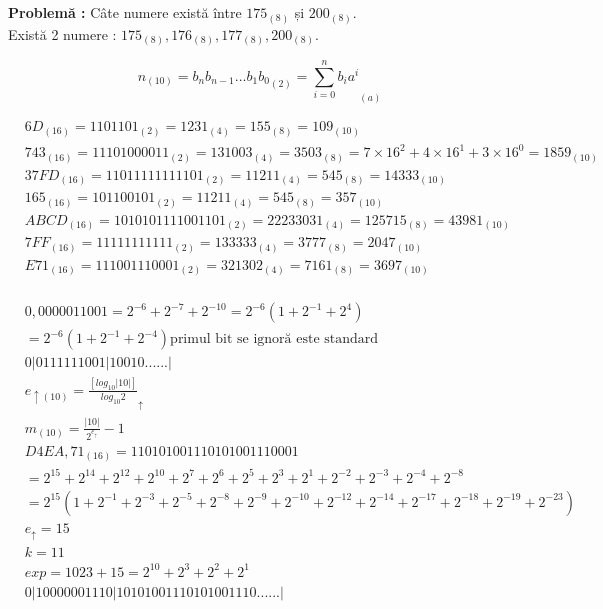 \documentclass[12pt]{article}
\begin{document}
\textbf{Problemă :}
Câte numere există între $175_{(8)}$ și $200_{(8)}$.\\
Există 2 numere : $175_{(8)}, 176_{(8)}, 177_{(8)}, 200_{(8)}$.

\begin{equation}
    n_{(10)}={b_{n}b_{n-1}...b_{1}b_{0}}_{(2)}={\sum_{i=0}^{n}b_{i}a^{i}}_{(a)}
\end{equation}

\begin{align*}
    & 6D_{(16)}=1101101_{(2)}=1231_{(4)}=155_{(8)}=109_{(10)}\\
    & 743_{(16)}=11101000011_{(2)}=131003_{(4)}=3503_{(8)}=7\times 16^2 + 4 \times 16^1 +3 \times 16^0 = 1859_{(10)}\\
    & 37FD_{(16)}=11011111111101_{(2)}=11211_{(4)}=545_{(8)}=14333_{(10)}\\
    & 165_{(16)}=101100101_{(2)}=11211_{(4)}=545_{(8)}=357_{(10)}\\
    & ABCD_{(16)}=1010101111001101_{(2)}=22233031_{(4)}=125715_{(8)}=43981_{(10)}\\
    & 7FF_{(16)}=11111111111_{(2)}=133333_{(4)}=3777_{(8)}=2047_{(10)}\\
    & E71_{(16)}=111001110001_{(2)}=321302_{(4)}=7161_{(8)}=3697_{(10)}\\
\end{align*}

\begin{align*}
    & 0,0000011001=2^{-6}+2^{-7}+2^{-10}=2^{-6}(1+2^{-1}+2^{4})\\
    & =2^{-6}(1+2^{-1}+2^{-4}) \text{primul bit se ignoră este standard}\\
    & 0|0111111001|10010......| \\
    & e_{\uparrow(10)}=\frac{[log_{10}|10|]}{log_{10}2}_{\uparrow} \\
    & m_{(10)}=\frac{|10|}{2^{e_{\uparrow}}}-1\\
    & D4EA,71_{(16)}=110101001110101001110001 \\
    & = 2^{15}+2^{14}+2^{12}+2^{10}+2^7+2^6+2^5+2^3+2^1+2^{-2}+2^{-3}+2^{-4}+2^{-8} \\
    & = 2^{15}(1+2^{-1}+2^{-3}+2^{-5}+2^{-8}+2^{-9}+2^{-10}+2^{-12}+2^{-14}+2^{-17}+2^{-18}+2^{-19}+2^{-23}) \\
    & e_{\uparrow}=15 \\
    & k=11 \\
    & exp=1023+15=2^10+2^3+2^2+2^1 \\
    & 0|10000001110|10101001110101001110......| \\
\end{align*}
\end{document}
